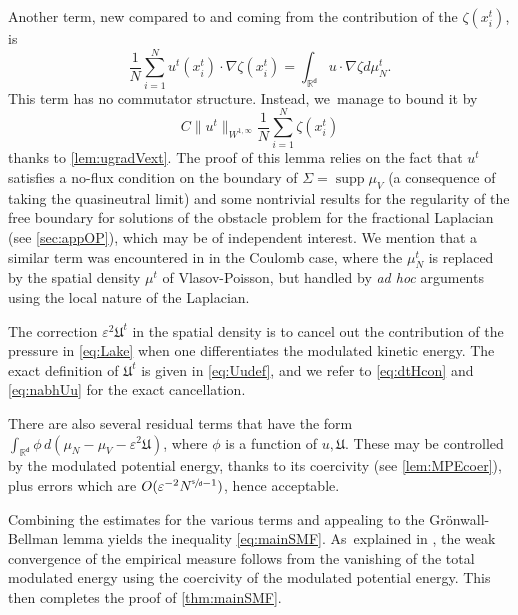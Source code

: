 \documentclass[10pt]{amsart}
\theoremstyle{plain}
\theoremstyle{definition}
\DeclareMathOperator{\supp}{supp}
\newcommand{\R}{{\mathbb{R}}}
\let\vep\varepsilon
\let\nab\nabla
\newcommand{\Uu}{\mathfrak{U}}
\renewcommand{\d}{\mathsf{d}}
\newcommand{\s}{\mathsf{s}}
\begin{document}
Another term, new compared to \cite{HkI2021, Rosenzweig2021ne} and coming from the contribution of the $\zeta(x_i^t)$, is\vspace*{-3pt}
\begin{equation*}
\frac1N\sum_{i=1}^N u^t(x_i^t)\cdot\nab\zeta(x_i^t) = \int_{\R^\d} u\cdot\nab\zeta d\mu_N^t.
\end{equation*}
This term has no commutator structure. Instead, we~manage to bound it by\vspace*{-3pt}
\begin{equation*}
C\|u^t\|_{W^{1,\infty}}\frac1N\sum_{i=1}^N \zeta(x_i^t)
\end{equation*}
thanks to \cref{lem:ugradVext}. The proof of this lemma relies on the fact that $u^t$ satisfies a no-flux condition on the boundary of $\Sigma = \supp\mu_V$ (a consequence of taking the quasineutral limit) and some nontrivial results for the regularity of the free boundary for solutions of the obstacle problem for the fractional Laplacian (see \cref{sec:appOP}), which may be of independent interest. We mention that a similar term was encountered in \cite{BCGM2015} in the Coulomb case, where the $\mu_N^t$ is replaced by the spatial density $\mu^t$ of Vlasov-Poisson, but handled by \emph{ad hoc} arguments {using the local nature of the Laplacian}.

The correction $\vep^2\Uu^t$ in the spatial density is to cancel out the contribution of the pressure in \eqref{eq:Lake} when one differentiates the modulated kinetic energy. The exact definition of $\Uu^t$ is given in \eqref{eq:Uudef}, and we refer to \eqref{eq:dtHcon} and \eqref{eq:nabhUu} for the exact cancellation.

There are also several residual terms that have the form $\int_{\R^\d} \phi\, d(\mu_N-\mu_V-\vep^2\Uu)$, where $\phi$ is a function of $u,\Uu$. These may be controlled by the modulated potential energy, thanks to its coercivity (see \cref{lem:MPEcoer}), plus errors which are $O(\vep^{-2}N^{\sfrac{\s}{\d}-1})$, hence acceptable.

Combining the estimates for the various terms and appealing to the Grönwall-Bellman lemma yields the inequality \eqref{eq:mainSMF}. As~explained in {\cite[\S 4.2]{Rosenzweig2021ne}}, the weak convergence of the empirical measure follows from the vanishing of the total modulated energy using the coercivity of the modulated potential energy. This then completes the proof of \cref{thm:mainSMF}.
\end{document}
